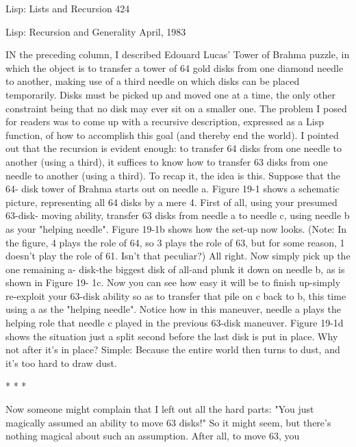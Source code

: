 Lisp: Lists and Recursion                                                            424

                  Lisp: Recursion and Generality
                                      April, 1983




IN the preceding column, I described Edouard Lucas' Tower of Brahma puzzle, in
which the object is to transfer a tower of 64 gold disks from one diamond needle to
another, making use of a third needle on which disks can be placed temporarily. Disks
must be picked up and moved one at a time, the only other constraint being that no
disk may ever sit on a smaller one. The problem I posed for readers was to come up
with a recursive description, expressed as a Lisp function, of how to accomplish this
goal (and thereby end the world).
        I pointed out that the recursion is evident enough: to transfer 64 disks from
one needle to another (using a third), it suffices to know how to transfer 63 disks from
one needle to another (using a third). To recap it, the idea is this. Suppose that the 64-
disk tower of Brahma starts out on needle a. Figure 19-1 shows a schematic picture,
representing all 64 disks by a mere 4. First of all, using your presumed 63-disk-
moving ability, transfer 63 disks from needle a to needle c, using needle b as your
"helping needle". Figure 19-1b shows how the set-up now looks. (Note: In the figure,
4 plays the role of 64, so 3 plays the role of 63, but for some reason, 1 doesn't play the
role of 61. Isn't that peculiar?) All right. Now simply pick up the one remaining a-
disk-the biggest disk of all-and plunk it down on needle b, as is shown in Figure 19-
1c. Now you can see how easy it will be to finish up-simply re-exploit your 63-disk
ability so as to transfer that pile on c back to b, this time using a as the "helping
needle". Notice how in this maneuver, needle a plays the helping role that needle c
played in the previous 63-disk maneuver. Figure 19-1d shows the situation just a split
second before the last disk is put in place. Why not after it's in place? Simple:
Because the entire world then turns to dust, and it's too hard to draw dust.

                                        *   * *

Now someone might complain that I left out all the hard parts: "You just magically
assumed an ability to move 63 disks!" So it might seem, but there's nothing magical
about such an assumption. After all, to move 63, you





